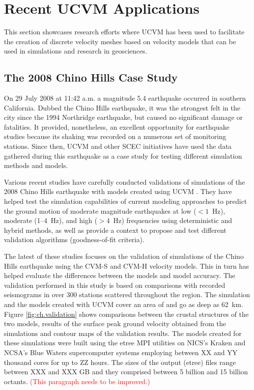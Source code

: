 
\section{Recent UCVM Applications}

This section showcases research efforts where UCVM has been used to facilitate the creation of discrete velocity meshes based on velocity models that can be used in simulations and research in geosciences.

\subsection{The 2008 Chino Hills Case Study}

On 29 July 2008 at 11:42 a.m. a magnitude  5.4 earthquake occurred in southern California. Dubbed the Chino Hills earthquake, it was the strongest felt in the city since the 1994 Northridge earthquake, but caused no significant damage or fatalities. It provided, nonetheless, an excellent opportunity for earthquake studies because its shaking was recorded on a numerous set of monitoring stations. Since then, UCVM and other SCEC initiatives have used the data gathered during this earthquake as a case study for testing different simulation methods and models. 

Various recent studies have carefully conducted validations of simulations of the 2008 Chino Hills earthquake with models created using UCVM \citep[e.g.,][]{Olsen_2010_SRL, Taborda_2013_BSSA, Taborda_2014_BSSA}. They have helped test the simulation capabilities of current modeling approaches to predict the ground motion of moderate magnitude earthquakes at low ($<1$~Hz), moderate (1--4~Hz), and high ($>4$~Hz) frequencies using deterministic and hybrid methods, as well as provide a context to propose and test different validation algorithms (goodness-of-fit criteria). 

The latest of these studies \citep{Taborda_2014_BSSA} focuses on the validation of simulations of the Chino Hills earthquake using the CVM-S and CVM-H velocity models. This in turn has helped evaluate the differences between the models and model accuracy. The validation performed in this study is based on comparisons with recorded seismograms in over 300 stations scattered throughout the region. The simulation and the models created with UCVM cover an area of  and go as deep as 62~km. Figure \ref{fig:ch.validation} shows comparisons between the crustal structures of the two models, results of the surface peak ground velocity obtained from the simulations and contour maps of the validation results. The models created for these simulations were built using the etree MPI utilities on NICS's Kraken and NCSA's Blue Waters supercomputer systems employing between XX and YY thousand cores for up to ZZ hours. The sizes of the output (etree) files range between XXX and XXX GB and they comprised between 5 billion and 15 billion octants. \textcolor{red}{(This paragraph needs to be improved.)}

